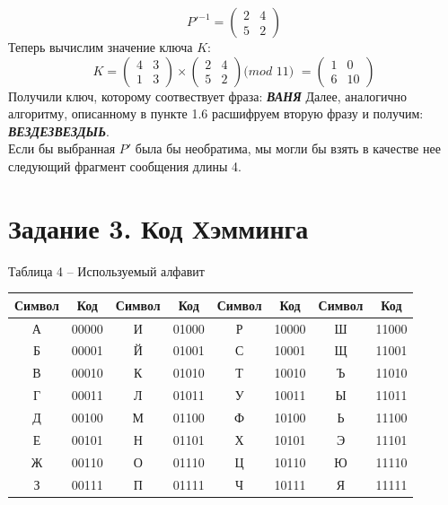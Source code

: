 \documentclass[a5paper, 10pt]{article}
\theoremstyle{definition}
\theoremstyle{plain}
\theoremstyle{remark}
\begin{document}
\begin{equation}
P'^{-1} =
\begin{pmatrix}
2 & 4\\
5 & 2
\end{pmatrix} 
\end{equation}
Теперь вычислим значение ключа $K$:
\begin{equation}
K =
\begin{pmatrix}
4 & 3\\
1 & 3
\end{pmatrix} 
\times
\begin{pmatrix}
2 & 4\\
5 & 2
\end{pmatrix} 
\textit{(mod 11) }=
\begin{pmatrix}
1 & 0\\
6 & 10
\end{pmatrix} 
\end{equation}
Получили ключ, которому соотвествует фраза: \textbf{\textit{ВАНЯ}}
Далее, аналогично алгоритму, описанному в пункте 1.6 расшифруем вторую фразу и получим:  \textbf{\textit{ВЕЗДЕЗВЕЗДЫЬ}}.\\
Если бы выбранная $P'$ была бы необратима, мы могли бы взять в качестве нее следующий фрагмент сообщения длины 4.


\section{Задание 3. Код Хэмминга}
\begin{center}
Таблица 4 -- Используемый алфавит\\
\begin{tabular}{ |c|c|c|c|c|c|c|c| } 
 \hline
Символ & Код & Символ & Код & Символ & Код & Символ & Код\\
\hline
А & 00000 & И  & 01000 & Р  & 10000  & Ш  & 11000 \\
 \hline
Б & 00001 & Й  & 01001 & С  & 10001  & Щ  & 11001 \\
 \hline
В & 00010 & К  & 01010 & Т  & 10010  & Ъ  & 11010 \\
 \hline
Г & 00011 & Л  & 01011 & У  & 10011  & Ы  & 11011 \\
 \hline
Д & 00100 & М  & 01100 & Ф  & 10100  & Ь  & 11100 \\
 \hline
Е & 00101 & Н & 01101 & Х  & 10101  & Э  & 11101 \\
 \hline
Ж & 00110 & О  & 01110 & Ц  & 10110  & Ю  & 11110 \\
 \hline
З & 00111 & П & 01111 & Ч  & 10111  & Я  & 11111 \\
 \hline
\end{tabular}
\end{center}
\end{document}
